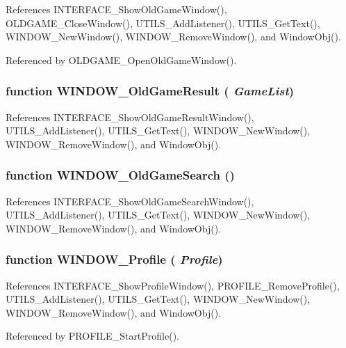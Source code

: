 References INTERFACE\_\-ShowOldGameWindow(), OLDGAME\_\-CloseWindow(), UTILS\_\-AddListener(), UTILS\_\-GetText(), WINDOW\_\-NewWindow(), WINDOW\_\-RemoveWindow(), and WindowObj().

Referenced by OLDGAME\_\-OpenOldGameWindow().
\subsubsection{\setlength{\rightskip}{0pt plus 5cm}function WINDOW\_\-OldGameResult ( {\em GameList})}\label{window_2window_8js_2394126df350f76d1187c15e281a52ba}




References INTERFACE\_\-ShowOldGameResultWindow(), UTILS\_\-AddListener(), UTILS\_\-GetText(), WINDOW\_\-NewWindow(), WINDOW\_\-RemoveWindow(), and WindowObj().
\subsubsection{\setlength{\rightskip}{0pt plus 5cm}function WINDOW\_\-OldGameSearch ()}\label{window_2window_8js_cb65f4ab22f79c8778aa45561d67eab0}




References INTERFACE\_\-ShowOldGameSearchWindow(), UTILS\_\-AddListener(), UTILS\_\-GetText(), WINDOW\_\-NewWindow(), WINDOW\_\-RemoveWindow(), and WindowObj().
\subsubsection{\setlength{\rightskip}{0pt plus 5cm}function WINDOW\_\-Profile ( {\em Profile})}\label{window_2window_8js_200e97ff4969f4c9092c6ac314e06c1e}




References INTERFACE\_\-ShowProfileWindow(), PROFILE\_\-RemoveProfile(), UTILS\_\-AddListener(), UTILS\_\-GetText(), WINDOW\_\-NewWindow(), WINDOW\_\-RemoveWindow(), and WindowObj().

Referenced by PROFILE\_\-StartProfile().
